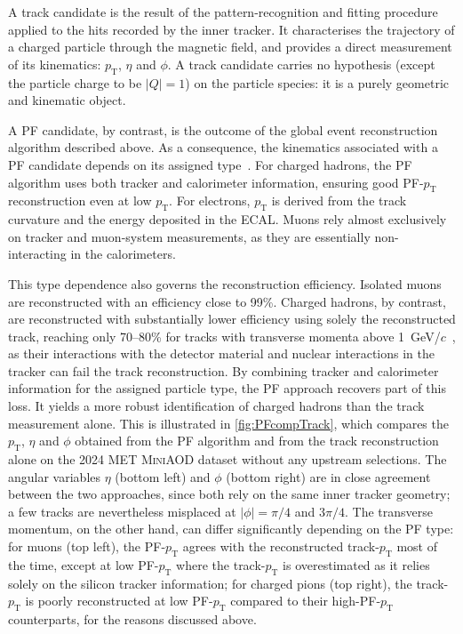 A track candidate is the result of the pattern-recognition and fitting procedure applied to the hits recorded by the inner tracker. It characterises the trajectory of a charged particle through the magnetic field, and provides a direct measurement of its kinematics: $p_{\mathrm{T}}$, $\eta$ and $\phi$. A track candidate carries no hypothesis (except the particle charge to be $|Q|=1$) on the particle species: it is a purely geometric and kinematic object.

A PF candidate, by contrast, is the outcome of the global event reconstruction algorithm described above. As a consequence, the kinematics associated with a PF candidate depends on its assigned type~\cite{PFalgo}. For charged hadrons, the PF algorithm uses both tracker and calorimeter information, ensuring good PF-$p_{\mathrm{T}}$ reconstruction even at low $p_{\mathrm{T}}$. For electrons, $p_{\mathrm{T}}$ is derived from the track curvature and the energy deposited in the ECAL. Muons rely almost exclusively on tracker and muon-system measurements, as they are essentially non-interacting in the calorimeters.

This type dependence also governs the reconstruction efficiency. Isolated muons are reconstructed with an efficiency close to 99\%. Charged hadrons, by contrast, are reconstructed with substantially lower efficiency using solely the reconstructed track, reaching only 70--80\% for tracks with transverse momenta above 1~GeV/$c$~\cite{PFalgo}, as their interactions with the detector material and nuclear interactions in the tracker can fail the track reconstruction. By combining tracker and calorimeter information for the assigned particle type, the PF approach recovers part of this loss. It yields a more robust identification of charged hadrons than the track measurement alone. This is illustrated in \cref{fig:PFcompTrack}, which compares the $p_{\mathrm{T}}$, $\eta$ and $\phi$ obtained from the PF algorithm and from the track reconstruction alone on the 2024 MET \textsc{MiniAOD} dataset without any upstream selections. The angular variables $\eta$ (bottom left) and $\phi$ (bottom right) are in close agreement between the two approaches, since both rely on the same inner tracker geometry; a few tracks are nevertheless misplaced at $|\phi|=\pi/4$ and $3\pi/4$. The transverse momentum, on the other hand, can differ significantly depending on the PF type: for muons (top left), the PF-$p_{\mathrm{T}}$ agrees with the reconstructed track-$p_{\mathrm{T}}$ most of the time, except at low PF-$p_{\mathrm{T}}$ where the track-$p_{\mathrm{T}}$ is overestimated as it relies solely on the silicon tracker information; for charged pions (top right), the track-$p_{\mathrm{T}}$ is poorly reconstructed at low PF-$p_{\mathrm{T}}$ compared to their high-PF-$p_{\mathrm{T}}$ counterparts, for the reasons discussed above.

